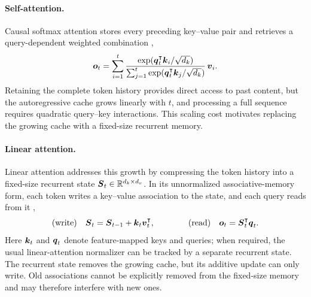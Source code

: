 \documentclass[11pt,letterpaper,logo]{yalearxiv}
\begin{document}
\paragraph{Self-attention.}
Causal softmax attention stores every preceding key--value pair and retrieves a
query-dependent weighted combination \citep{vaswani2017attention},
  \begin{equation}
    \boldsymbol{o}_t
    =\sum_{i=1}^{t}
      \frac{\exp(\boldsymbol{q}_t^{\intercal}\boldsymbol{k}_i/\sqrt{d_k})}
      {\sum_{j=1}^{t}\exp(\boldsymbol{q}_t^{\intercal}\boldsymbol{k}_j/\sqrt{d_k})}\,\boldsymbol{v}_i.
    \label{eq:softmax-attention}
  \end{equation}
  Retaining the complete token history provides direct access to past content, but the
  autoregressive cache grows linearly with $t$, and processing a full sequence requires
  quadratic query--key interactions. This scaling cost motivates replacing the growing cache
  with a fixed-size recurrent memory.

\paragraph{Linear attention.}
Linear attention addresses this growth by compressing the token history into a fixed-size
recurrent state $\boldsymbol{S}_t \in \mathbb{R}^{d_k \times d_v}$. In its unnormalized associative-memory
form, each token writes a key--value association to the state, and each query reads from it
\citep{katharopoulos2020transformers},
  \begin{equation}
    \text{(write)}\quad \boldsymbol{S}_t = \boldsymbol{S}_{t-1} + \boldsymbol{k}_t \boldsymbol{v}_t^{\intercal},
    \qquad\qquad
    \text{(read)}\quad \boldsymbol{o}_t = \boldsymbol{S}_t^{\intercal} \boldsymbol{q}_t .
    \label{eq:linattn}
  \end{equation}
  Here $\boldsymbol{k}_t$ and $\boldsymbol{q}_t$ denote feature-mapped keys and queries; when required, the usual
  linear-attention normalizer can be tracked by a separate recurrent state.
  The recurrent state removes the growing cache, but its additive update can only write. Old
  associations cannot be explicitly removed from the fixed-size memory and may therefore
  interfere with new ones.
\end{document}
